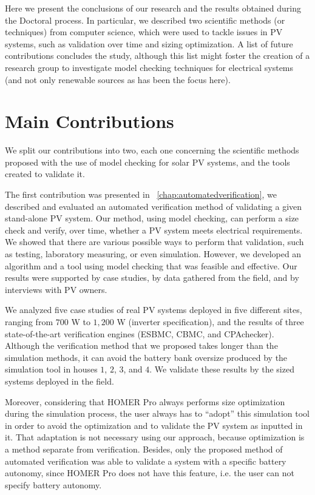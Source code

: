Here we present the conclusions of our research and the results obtained during the Doctoral process. In particular, we described two scientific methods (or techniques) from computer science, which were used to tackle issues in PV systems, such as validation over time and sizing optimization. A list of future contributions concludes the study, although this list might foster the creation of a research group to investigate model checking techniques for electrical systems (and not only renewable sources as has been the focus here).

\section{Main Contributions}

We split our contributions into two, each one concerning the scientific methods proposed with the use of model checking for solar PV systems, and the tools created to validate it.

The first contribution was presented in ~\autoref{chap:automatedverification}, we described and evaluated an automated verification method of validating a given stand-alone PV system. Our method, using model checking, can perform a size check and verify, over time, whether a PV system meets electrical requirements. We showed that there are various possible ways to perform that validation, such as testing, laboratory measuring, or even simulation. However, we developed an algorithm and a tool using model checking that was feasible and effective. Our results were supported by case studies, by data gathered from the field, and by interviews with PV owners.

We analyzed five case studies of real PV systems deployed in five different sites, ranging from $700$ W to $1,200$ W (inverter specification), and the results of three state-of-the-art verification engines (ESBMC, CBMC, and CPAchecker). Although the verification method that we proposed takes longer than the simulation methods, it can avoid the battery bank oversize produced by the simulation tool in houses $1$, $2$, $3$, and $4$. We validate these results by the sized systems deployed in the field.

Moreover, considering that HOMER Pro always performs size optimization during the simulation process, the user always has to ``adopt'' this simulation tool in order to avoid the optimization and to validate the PV system as inputted in it. That adaptation is not necessary using our approach, because optimization is a method separate from verification. Besides, only the proposed method of automated verification was able to validate a system with a specific battery autonomy, since HOMER Pro does not have this feature, i.e. the user can not specify battery autonomy.


